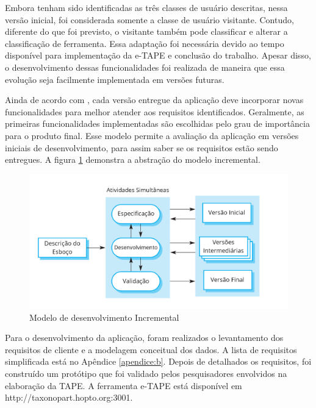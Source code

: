 \par
Embora tenham sido identificadas as três classes de usuário descritas, nessa versão inicial, foi considerada somente a classe de usuário visitante.
Contudo, diferente do que foi previsto, o visitante também pode classificar e alterar a classificação de ferramenta. Essa adaptação foi necessária devido ao tempo disponível 
para implementação da e-TAPE e conclusão do trabalho. Apesar disso, o desenvolvimento dessas funcionalidades foi realizada de maneira que essa evolução seja facilmente 
implementada em versões futuras.

\par
Ainda de acordo com , cada versão entregue da aplicação deve incorporar novas funcionalidades para melhor atender aos requisitos identificados. Geralmente, as primeiras funcionalidades implementadas são escolhidas pelo grau de importância para o produto final. Esse modelo permite a avaliação da aplicação em versões iniciais de desenvolvimento, para assim saber 
se os requisitos estão sendo entregues. A figura \ref{fig:modelo-incremental} demonstra a abstração do modelo incremental.

\begin{figure}[!ht]
    \centering
    \includegraphics[scale=0.20]{./figuras/modelo_incremental.png}
    \caption{Modelo de desenvolvimento Incremental }
    \label{fig:modelo-incremental}
\end{figure}

\par
Para o desenvolvimento da aplicação, foram realizados o levantamento dos requisitos de cliente e a modelagem conceitual dos dados. A lista de requisitos simplificada está no Apêndice \ref{apendice:b}. 
Depois de detalhados os requisitos, foi construído um protótipo que foi validado pelos pesquisadores envolvidos na elaboração da TAPE. A ferramenta e-TAPE está disponível em http://taxonopart.hopto.org:3001.

